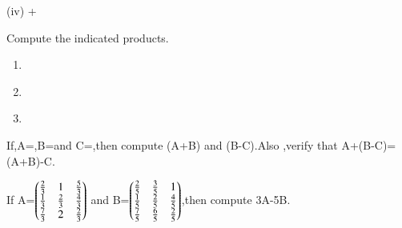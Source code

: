 (iv) +\\
\item Compute the indicated products.
\begin{enumerate}
\item {} 
\item {} \\
\item  {}
\end{enumerate}
\solution

\item If,A=,B=and C=,then compute (A+B) and (B-C).Also ,verify that A+(B-C)=(A+B)-C.\\
\solution

\item If A=$\begin{pmatrix}\frac{2}{3} & 1 & \frac{5}{3}\\ \frac{1}{3} & \frac{2}{3} & \frac{4}{3} \\ \frac{7}{3} &2  & \frac{2}{3}\end{pmatrix}$ and B=$\begin{pmatrix}\frac{2}{5} & \frac{3}{5} &1 \\ \frac{1}{5} & \frac{2}{5} & \frac{4}{5}\\ \frac{7}{5} & \frac{6}{5} & \frac{2}{5}\end{pmatrix}$,then compute 3A-5B.\\

